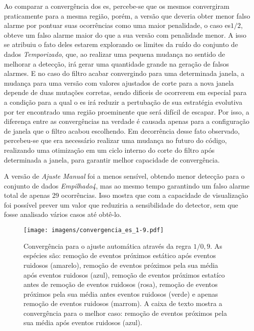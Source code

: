 Ao comparar a convergência dos \acs{es}, percebe-se que os mesmos
convergiram praticamente para a mesma região, porém, a versão que
deveria obter menor falso alarme por pontuar suas ocorrências como uma
maior penalidade, o caso \acs{es}$ 1/2$, obteve um falso alarme maior
do que a sua versão com penalidade menor. A isso se atribuiu o fato
deles estarem explorando os limites da ruído do conjunto de dados
\emph{Temporizado}, que, ao realizar uma pequena mudança no sentido de
melhorar a detecção, irá gerar uma quantidade grande na geração de
falsos alarmes. E no caso do filtro acabar convergindo para uma
determinada janela, a mudança para uma versão com valores ajustados de
corte para a nova janela depende de duas mutações corretas, sendo
dificeis de ocorrerem em especial para a condição para a qual o
\acs{es} irá reduzir a pertubação de sua estratégia evolutiva por ter
encontrado uma região proeminente que será difícil de escapar. Por
isso, a diferença entre as convergências na verdade é causada apenas
para a configuração de janela que o filtro acabou escolhendo. Em
decorrência desse fato observado, percebeu-se que era necessário
realizar uma mudança no futuro do código, realizando uma otimização
em um ciclo interno do corte do filtro após determinada a janela, para
garantir melhor capacidade de convergência.

A versão de \emph{Ajuste Manual} foi a menos sensível, obtendo menor
detecção para o conjunto de dados \emph{Empilhado4}, mas ao mesmo
tempo garantindo um falso alarme total de apenas 29 ocorrências.
Isso mostra que com a capacidade de visualização foi possível prever
um valor que reduziria a sensibilidade do detector, sem que fosse
analisado vários casos até obtê-lo.

\begin{figure}[!htb]
\centering
\texttt{[image: imagens/convergencia\_es\_1-9.pdf]}
\caption[Convergência para o ajuste automática através da regra
$1/0,9$.] {Convergência para o ajuste automática através da regra
$1/0,9$. As espécies são: remoção de eventos próximos estático após
eventos ruidosos (amarelo), remoção de eventos próximos pela sua média
após eventos ruidosos (azul), remoção de eventos próximos estatíco
antes de remoção de eventos ruidosos (rosa), remoção de eventos
próximos pela sua média antes eventos ruidosos (verde) e apenas
remoção de eventos ruidosos (marrom). A caixa de texto mostra a
convergência para o melhor caso: remoção de eventos próximos pela sua
média após eventos ruidosos (azul).}
\label{fig:convergencia_es_1}
\end{figure}


